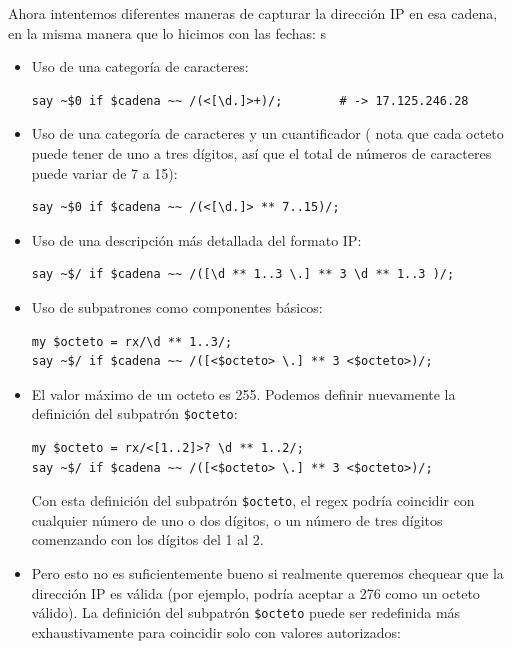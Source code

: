 Ahora intentemos diferentes maneras de capturar la dirección
IP en esa cadena, en la misma manera que lo hicimos con las 
fechas:
s
\begin{itemize}     

\item Uso de una categoría de caracteres:

\begin{verbatim}
say ~$0 if $cadena ~~ /(<[\d.]>+)/;        # -> 17.125.246.28
\end{verbatim}
%

\item Uso de una categoría de caracteres y un cuantificador (
nota que cada octeto puede tener de uno a tres dígitos, así que 
el total de números de caracteres puede variar de 7 a 15):

\begin{verbatim}
say ~$0 if $cadena ~~ /(<[\d.]> ** 7..15)/;  
\end{verbatim}
%

\item Uso de una descripción más detallada del formato IP:
\begin{verbatim}
say ~$/ if $cadena ~~ /([\d ** 1..3 \.] ** 3 \d ** 1..3 )/;
\end{verbatim}
%

\item Uso de subpatrones como componentes básicos:
\begin{verbatim}
my $octeto = rx/\d ** 1..3/;
say ~$/ if $cadena ~~ /([<$octeto> \.] ** 3 <$octeto>)/;
\end{verbatim}
%

\item El valor máximo de un octeto es 255. Podemos definir
nuevamente la definición del subpatrón \verb|$octeto|:
\begin{verbatim}
my $octeto = rx/<[1..2]>? \d ** 1..2/;
say ~$/ if $cadena ~~ /([<$octeto> \.] ** 3 <$octeto>)/;
\end{verbatim}
%
Con esta definición del subpatrón \verb|$octeto|,
el regex podría coincidir con cualquier número de uno 
o dos dígitos, o un número de tres dígitos comenzando con
los dígitos del 1 al 2.

\item Pero esto no es suficientemente bueno si realmente 
queremos chequear que la dirección IP es válida (por ejemplo,
podría aceptar a 276 como un octeto válido). La definición
del subpatrón \verb|$octeto| puede ser redefinida más
exhaustivamente para coincidir solo con valores
autorizados: 


\end{itemize}
